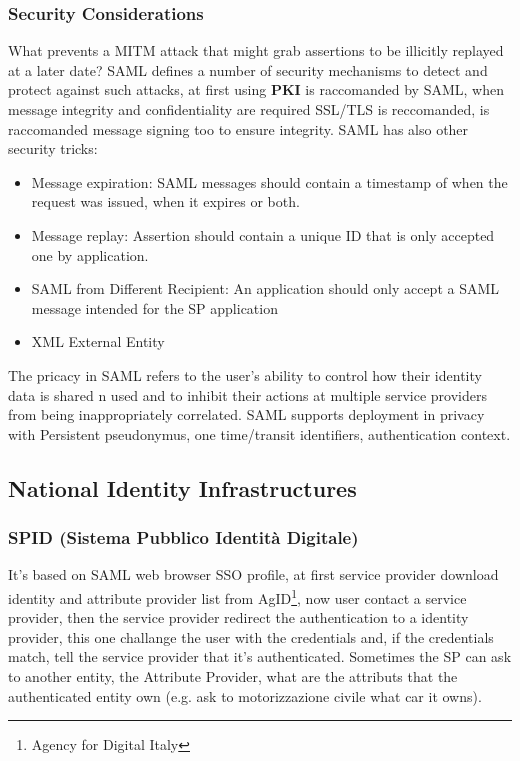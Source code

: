 \subsubsection{Security Considerations}
What prevents a MITM attack that might grab assertions to be illicitly replayed at a later date? SAML defines a number of security mechanisms to detect and protect against such attacks, at first using \textbf{PKI} is raccomanded by SAML, when message integrity and confidentiality are required SSL/TLS is reccomanded, is raccomanded message signing too to ensure integrity. SAML has also other security tricks:
\begin{itemize}
    \item Message expiration: SAML messages should contain a timestamp of when the request was issued, when it expires or both.
    \item Message replay: Assertion should contain a unique ID that is only accepted one by application.
    \item SAML from Different Recipient: An application should only accept a SAML message intended for the SP application
    \item XML External Entity
\end{itemize}
The pricacy in SAML refers to the user's ability to control how their identity data is shared n used and to inhibit their actions at multiple service providers from being inappropriately correlated. SAML supports deployment in privacy with Persistent pseudonymus, one time/transit identifiers, authentication context.

\subsection{National Identity Infrastructures}
\subsubsection{SPID (Sistema Pubblico Identità Digitale)}
It's based on SAML web browser SSO profile, at first service provider download identity and attribute provider list from AgID\footnote{Agency for Digital Italy}, now user contact a service provider, then the service provider redirect the authentication to a identity provider, this one challange the user with the credentials and, if the credentials match, tell the service provider that it's authenticated. Sometimes the SP can ask to another entity, the Attribute Provider, what are the attributs that the authenticated entity own (e.g. ask to motorizzazione civile what car it owns).

